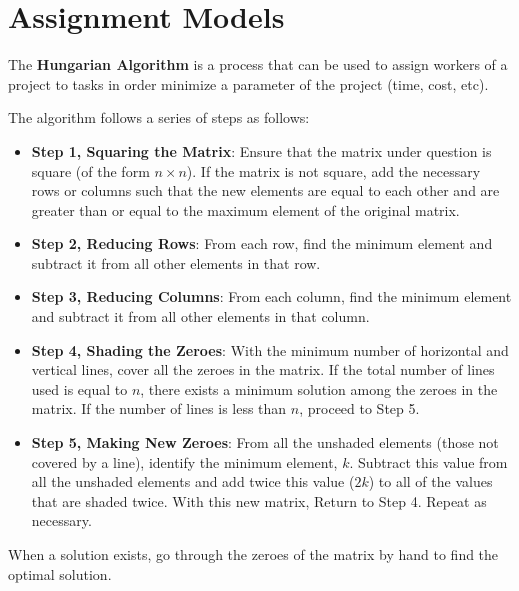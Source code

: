%
%
%



\section{Assignment Models} \label{Module1:AsgnmtModels}

\begin{defn} \label{mod1:defn:HungAlg}
	The \textbf{Hungarian Algorithm} is a process that can be used to assign workers of a project to tasks in order minimize a parameter of the project (time, cost, etc).
\end{defn}


\begin{defn} \label{mod1:defn:HungAlgSteps}
	The algorithm follows a series of steps as follows:
	\begin{itemize}
		\item \textbf{Step 1, Squaring the Matrix}: Ensure that the matrix under question is square (of the form $n\times n$). If the matrix is not square, add the necessary rows or columns such that the new elements are equal to each other and are greater than or equal to the maximum element of the original matrix.
		\item \textbf{Step 2, Reducing Rows}: From each row, find the minimum element and subtract it from all other elements in that row.
		\item \textbf{Step 3, Reducing Columns}: From each column, find the minimum element and subtract it from all other elements in that column.
		\item \textbf{Step 4, Shading the Zeroes}: With the minimum number of horizontal and vertical lines, cover all the zeroes in the matrix. If the total number of lines used is equal to $n$, there exists a minimum solution among the zeroes in the matrix. If the number of lines is less than $n$, proceed to Step 5. 
		\item \textbf{Step 5, Making New Zeroes}: From all the unshaded elements (those not covered by a line), identify the minimum element, $k$. Subtract this value from all the unshaded elements and add twice this value ($2k$) to all of the values that are shaded twice. With this new matrix, Return to Step 4. Repeat as necessary. \label{mod1:defn:HungAlgStep4}
	\end{itemize}
When a solution exists, go through the zeroes of the matrix by hand to find the optimal solution.
\end{defn}

